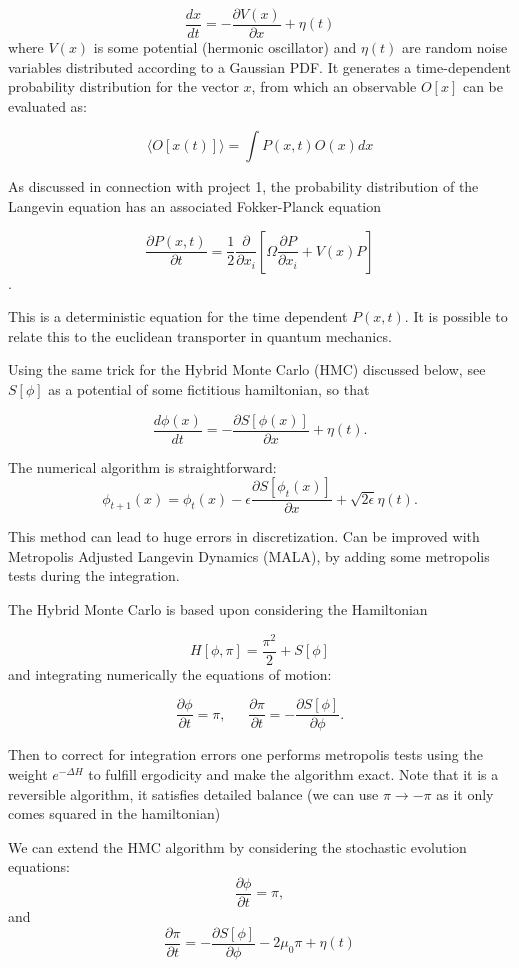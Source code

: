 \documentclass[%
oneside,                 %
final,                   %
10pt]{article}
\begin{document}
\[
    \frac{dx}{dt} = -\frac{\partial V(x)}{\partial x} + \eta(t)
\]
where $V(x)$ is some potential (hermonic oscillator) and $\eta(t)$ are random noise variables distributed according to a Gaussian PDF. 
It generates a time-dependent probability distribution for the vector $x$, from which an observable $O[x]$ can be evaluated as:

\[
 \langle O[x(t)] \rangle = \int P(x, t) O(x)dx
\]

As discussed in connection with project 1, the probability
distribution of the Langevin equation has an associated Fokker-Planck
equation

\[
\frac{\partial P(x,t)}{\partial t} = \frac{1}{2} \frac{\partial}{\partial x_i}\left[ \Omega \frac{\partial P}{\partial x_i} + V(x)P\right]
\].

This is a deterministic equation for the time dependent $P(x,t)$. It
is possible to relate this to the euclidean transporter in quantum
mechanics.

Using the same trick for the Hybrid Monte Carlo (HMC) discussed below,
see $S[\phi]$ as a potential of some fictitious hamiltonian, so that

\[
\frac{d\phi(x)}{dt} = -\frac{\partial S[\phi(x)]}{\partial x} + \eta(t).
\]

The numerical algorithm is straightforward:
\[
\phi_{t+1}(x) = \phi_t(x) - \epsilon \frac{\partial S[\phi_t(x)]}{\partial x} + \sqrt{2\epsilon}\eta(t).
\]

This method can lead to huge errors in discretization. Can be improved
with Metropolis Adjusted Langevin Dynamics (MALA), by adding some
metropolis tests during the integration.

The Hybrid Monte Carlo  is based upon considering the Hamiltonian

\[
   H[\phi,\pi] = \frac{\pi^2}{2} + S[\phi]
\]
and integrating numerically the equations of motion:

\[
  \frac{\partial \phi}{\partial t } = \pi, ~~~~~~~ \frac{\partial \pi}{\partial t } = -\frac{\partial S[\phi]}{\partial \phi}.
\]

Then to correct for integration errors one performs metropolis tests
using the weight $e^{-\Delta H}$ to fulfill ergodicity and make
the algorithm exact.  Note that it is a reversible algorithm,
it satisfies detailed balance (we can use $\pi \rightarrow - \pi$ as
it only comes squared in the hamiltonian)

We can extend the HMC algorithm by considering the stochastic evolution equations:
\[
        \frac{\partial \phi}{\partial t } = \pi,
    \]
and
\[
 \frac{\partial \pi}{\partial t } = -\frac{\partial S[\phi]}{\partial \phi} - 2\mu_0\pi + \eta(t)
\]
\end{document}
